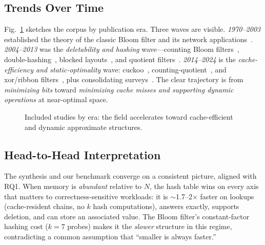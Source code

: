 \documentclass[conference]{IEEEtran}
\begin{document}
\subsection{Trends Over Time}
Fig.~\ref{fig:trend} sketches the corpus by publication era. Three waves are
visible. \emph{1970--2003} established the theory of the classic Bloom filter
and its network applications~\cite{bloom1970,broder2004network}. \emph{2004--2013}
was the \emph{deletability and hashing} wave---counting Bloom
filters~\cite{fan2000summary}, double-hashing~\cite{kirsch2008less}, blocked
layouts~\cite{putze2009cache}, and quotient filters~\cite{bender2012dont}.
\emph{2014--2024} is the \emph{cache-efficiency and static-optimality} wave:
cuckoo~\cite{fan2014cuckoo}, counting-quotient~\cite{pandey2017counting}, and
xor/ribbon filters~\cite{graf2020xor}, plus consolidating
surveys~\cite{luo2019optimizing,tarkoma2012bloom}. The clear trajectory is from
\emph{minimizing bits} toward \emph{minimizing cache misses and supporting
dynamic operations} at near-optimal space.

\begin{figure}[!t]
\centering
{}
\caption{Included studies by era: the field accelerates toward cache-efficient
and dynamic approximate structures.}
\label{fig:trend}
\end{figure}

\subsection{Head-to-Head Interpretation}
The synthesis and our benchmark converge on a consistent picture, aligned with
RQ1. When memory is \emph{abundant} relative to $N$, the hash table wins on
every axis that matters to correctness-sensitive workloads: it is
$\sim$1.7--2$\times$ faster on lookups (cache-resident chains, no $k$ hash
computations), answers exactly, supports deletion, and can store an associated
value. The Bloom filter's constant-factor hashing cost ($k=7$ probes) makes it
the \emph{slower} structure in this regime, contradicting a common assumption
that ``smaller is always faster.''
\end{document}
